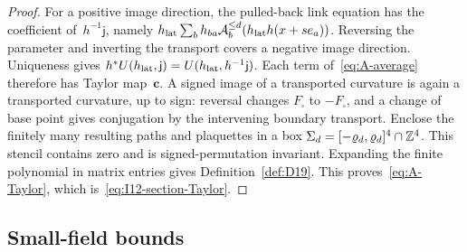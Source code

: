 \begin{proof}
For a positive image direction, the pulled-back link equation has the coefficient of~$h^{-1}\mathsf j$, namely $h_{\rm lat}\sum_bh_{ba}\mathcal A_b^{\le d}(h_{\rm lat}h(x+se_a))$. Reversing the parameter and inverting the transport covers a negative image direction. Uniqueness gives $h^*U(h_{\rm lat},\mathsf j)=U(h_{\rm lat},h^{-1}\mathsf j)$. Each term of~\eqref{eq:A-average} therefore has Taylor map~$\mathbf c$. A signed image of a transported curvature is again a transported curvature, up to sign: reversal changes $F_\square$ to $-F_\square$, and a change of base point gives conjugation by the intervening boundary transport. Enclose the finitely many resulting paths and plaquettes in a box $\Sigma_d=[-\varrho_d,\varrho_d]^4\cap\mathbb{Z}^4$. This stencil contains zero and is signed-permutation invariant. Expanding the finite polynomial in matrix entries gives Definition~\ref{def:D19}. This proves~\eqref{eq:A-Taylor}, which is~\eqref{eq:I12-section-Taylor}.
\end{proof}

\subsection{Small-field bounds}\label{sec:A-bounds}

